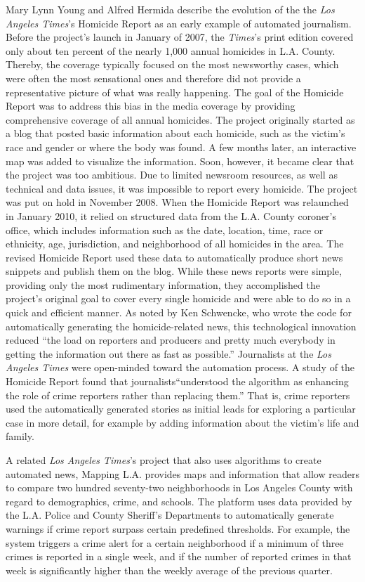 \documentclass[notoc, symmetric, nobib, nols]{towcenter-guideto-book}
\begin{document}
Mary Lynn Young and Alfred Hermida describe the evolution of the the \textit{Los Angeles Times}'s Homicide Report as an early example of automated journalism.\autocite{young15} Before the project's launch in January of 2007, the \textit{Times}'s print edition covered only about ten percent of the nearly 1,000 annual homicides in L.A. County. Thereby, the coverage typically focused on the most newsworthy cases, which were often the most sensational ones and therefore did not provide a representative picture of what was really happening. The goal of the Homicide Report was to address this bias in the media coverage by providing comprehensive coverage of all annual homicides. The project originally started as a blog that posted basic information about each homicide, such as the victim's race and gender or where the body was found. A few months later, an interactive map was added to visualize the information. Soon, however, it became clear that the project was too ambitious. Due to limited newsroom resources, as well as technical and data issues, it was impossible to report every homicide. The project was put on hold in November 2008. When the Homicide Report was relaunched in January 2010, it relied on structured data from the L.A. County coroner's office, which includes information such as the date, location, time, race or ethnicity, age, jurisdiction, and neighborhood of all homicides in the area. The revised Homicide Report used these data to automatically produce short news snippets and publish them on the blog. While these news reports were simple, providing only the most rudimentary information, they accomplished the project's original goal to cover every single homicide and were able to do so in a quick and efficient manner. As noted by Ken Schwencke, who wrote the code for automatically generating the homicide-related news, this technological innovation reduced ``the load on reporters and producers and pretty much everybody in getting the information out there as fast as possible.''\autocite{young15} Journalists at the \textit{Los Angeles Times} were open-minded toward the automation process. A study of the Homicide Report found that journalists``understood the algorithm as enhancing the role of crime reporters rather than replacing them.''\autocite{young15} That is, crime reporters used the automatically generated stories as initial leads for exploring a particular case in more detail, for example by adding information about the victim's life and family. 

A related \textit{Los Angeles Times}'s project that also uses algorithms to create automated news, Mapping L.A. provides maps and information that allow readers to compare two hundred seventy-two neighborhoods in Los Angeles County with regard to demographics, crime, and schools. The platform uses data provided by the L.A. Police and County Sheriff's Departments to automatically generate warnings if crime report surpass certain predefined thresholds. For example, the system triggers a crime alert for a certain neighborhood if a minimum of three crimes is reported in a single week, and if the number of reported crimes in that week is significantly higher than the weekly average of the previous quarter.
\end{document}
